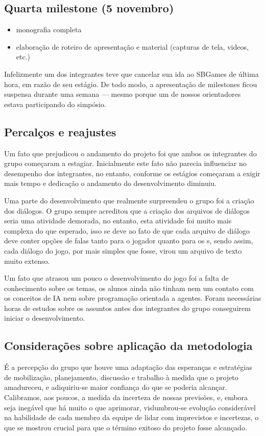 \subsection{Quarta milestone (5 novembro)}
\begin{itemize}
\item monografia completa
\item elaboração de roteiro de apresentação e material (capturas de tela, videos, etc.)
\end{itemize}

Infelizmente um dos integrantes teve que cancelar sua ida ao SBGames de última hora, em razão de seu estágio. De todo modo, a apresentação de milestones ficou suspensa durante uma semana --- mesmo porque um de nossos orientadores estava participando do simpósio.

\subsection{Percalços e reajustes}

Um fato que prejudicou o andamento do projeto foi que ambos os
integrantes do grupo começaram a estagiar. Inicialmente este fato não
parecia influenciar no desempenho dos integrantes, no entanto,
conforme os estágios começaram a exigir mais tempo e dedicação o
andamento do desenvolvimento diminuiu.

Uma parte do desenvolvimento que realmente surpreendeu o grupo foi a
criação dos diálogos. O grupo sempre acreditou que a criação dos
arquivos de diálogos seria uma atividade demorada, no entanto, esta
atividade foi muito mais complexa do que esperado, isso se deve ao
fato de que cada arquivo de diálogo deve conter opções de falas tanto
para o jogador quanto para os \npc{}s, sendo assim, cada diálogo do
jogo, por mais simples que fosse, virou um arquivo de texto muito
extenso.

Um fato que atrasou um pouco o desenvolvimento do jogo foi a falta de
conhecimento sobre os temas, os alunos ainda não tinham nem um contato
com os conceitos de IA nem sobre programação orientada a
agentes. Foram necessárias horas de estudos sobre os assuntos antes
dos integrantes do grupo conseguirem iniciar o desenvolvimento.


\subsection{Considerações sobre aplicação da metodologia}

É a percepção do grupo que houve uma adaptação das esperanças e
estratégias de mobilização, planejamento, discussão e trabalho à
medida que o projeto amadureceu, e adiquiriu-se maior confiança do que
se poderia alcançar. Calibramos, aos poucos, a medida da incerteza de
nossas previsões, e, embora seja inegável que há muito o que
aprimorar, vislumbrou-se evolução considerável na habilidade de cada
membro da equipe de lidar com imprevistos e incertezas, o que se
mostrou crucial para que o término exitoso do projeto fosse alcançado.





